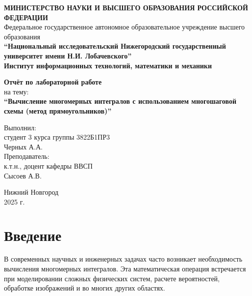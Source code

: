 \documentclass[a4paper,12pt]{article}
\begin{document}
  \begin{titlepage}
    \begin{center}
      \textbf{МИНИСТЕРСТВО НАУКИ И ВЫСШЕГО ОБРАЗОВАНИЯ РОССИЙСКОЙ ФЕДЕРАЦИИ} \\
      \vspace{0.5cm}
      Федеральное государственное автономное образовательное учреждение высшего образования \\
      \vspace{0.5cm}
      \textbf{\enquote{Национальный исследовательский Нижегородский государственный университет имени Н.И. Лобачевского}} \\
      \vspace{0.5cm}
      \textbf{Институт информационных технологий, математики и механики}
      \vfill

      \textbf{Отчёт по лабораторной работе} \\
      на тему: \\
      \textbf{\enquote{Вычисление многомерных интегралов с использованием многошаговой схемы (метод прямоугольников)}} \\
      \vfill

      \begin{flushright}
        Выполнил: \\
        студент 3 курса группы 3822Б1ПР3 \\
        Черных А.А. \\
        \vspace{1cm}
        Преподаватель: \\
        к.т.н., доцент кафедры ВВСП \\
        Сысоев А.В.
      \end{flushright}
      \vfill

      Нижний Новгород \\
      2025 г.
    \end{center}
  \end{titlepage}

  \newpage

  \tableofcontents

  \newpage


  \section{Введение}\label{sec:introduction}

  В современных научных и инженерных задачах часто возникает необходимость вычисления многомерных интегралов.
  Эта математическая операция встречается при моделировании сложных физических систем, расчете вероятностей, обработке изображений и во многих других областях.
\end{document}
